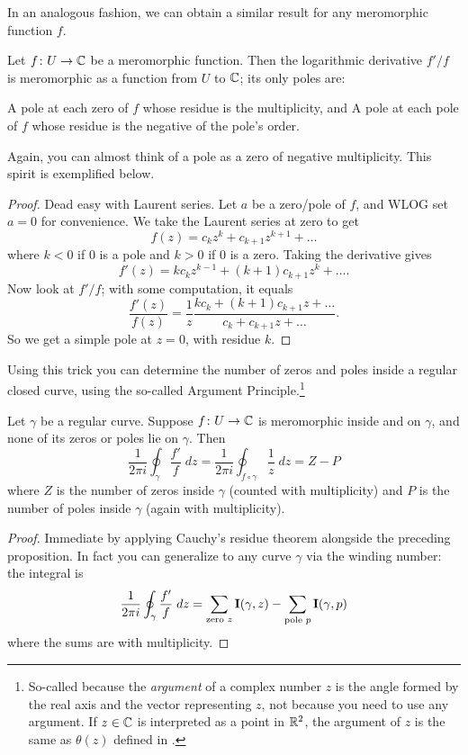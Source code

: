 In an analogous fashion, we can obtain a similar result for any meromorphic function $f$.
\begin{proposition}
	Let $f \colon U \to \mathbb C$ be a meromorphic function.
	Then the logarithmic derivative $f'/f$ is meromorphic as a function from $U$ to $\mathbb C$;
	its only poles are:
	\begin{enumerate}[(i)]
		\ii A pole at each zero of $f$ whose residue is the multiplicity, and
		\ii A pole at each pole of $f$ whose residue is the negative of the pole's order.
	\end{enumerate}
\end{proposition}
Again, you can almost think of a pole as a zero of negative multiplicity.
This spirit is exemplified below.
\begin{proof}
	Dead easy with Laurent series.
	Let $a$ be a zero/pole of $f$, and WLOG set $a=0$ for convenience.
	We take the Laurent series at zero to get
	\[ f(z) = c_k z^k + c_{k+1} z^{k+1} + \dots \] %
	where $k < 0$ if $0$ is a pole and $k > 0$ if $0$ is a zero.
	Taking the derivative gives
	\[ f'(z) = kc_k z^{k-1} + (k+1)c_{k+1}z^{k} + \dots. \]
	Now look at $f'/f$; with some computation, it equals
	\[
		\frac{f'(z)}{f(z)}
		= \frac 1z \frac{kc_k + (k+1)c_{k+1}z + \dots}{c_k + c_{k+1}z + \dots}.
	\]
	So we get a simple pole at $z=0$, with residue $k$.
\end{proof}

Using this trick you can determine the number of zeros and poles inside a regular closed curve,
using the so-called Argument Principle.\footnote{So-called because the \emph{argument} of a complex
number $z$ is the angle formed by the real axis and the vector representing $z$, not because you
need to use any argument. If $z \in \mathbb C$ is interpreted as a point in $\mathbb R^2$,
the argument of $z$ is the same as $\theta(z)$ defined in .}

\begin{theorem}
	\label{thm:arg_principle}
	Let $\gamma$ be a regular curve.
	Suppose $f \colon U \to \mathbb C$ is meromorphic inside and on $\gamma$, and
	none of its zeros or poles lie on $\gamma$.
	Then
	\[
		\frac{1}{2\pi i} \oint_\gamma \frac{f'}{f} \; dz
		= \frac{1}{2\pi i} \oint_{f \circ \gamma} \frac{1}{z} \; dz
		= Z - P
	\]
	where $Z$ is the number of zeros inside $\gamma$ (counted with multiplicity)
	and $P$ is the number of poles inside $\gamma$ (again with multiplicity).
\end{theorem}
\begin{proof}
	Immediate by applying Cauchy's residue theorem alongside the preceding proposition.
	In fact you can generalize to any curve $\gamma$ via the winding number:
	the integral is
	\[ \frac{1}{2\pi i} \oint_\gamma \frac{f'}{f} \; dz
		= \sum_{\text{zero $z$}} \operatorname{\mathbf I}(\gamma,z)
		- \sum_{\text{pole $p$}} \operatorname{\mathbf I}(\gamma,p) \]
	where the sums are with multiplicity.
\end{proof}

